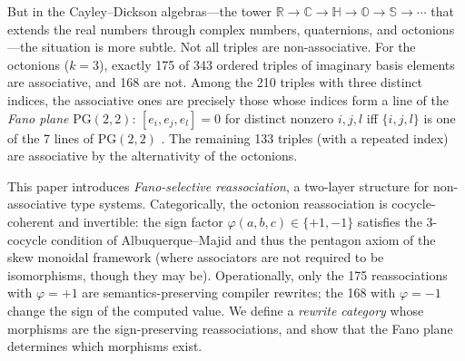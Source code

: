 \documentclass[11pt,a4paper]{article}
\theoremstyle{definition}
\theoremstyle{remark}
\newcommand{\RR}{\mathbb{R}}
\newcommand{\CC}{\mathbb{C}}
\newcommand{\HH}{\mathbb{H}}
\newcommand{\OO}{\mathbb{O}}
\newcommand{\SSS}{\mathbb{S}}
\newcommand{\PG}{\mathrm{PG}}
\begin{document}
But in the Cayley--Dickson algebras---the tower
$\RR \to \CC \to \HH \to \OO \to \SSS \to \cdots$ that extends the
real numbers through complex numbers, quaternions, and
octonions---the situation is more subtle. Not all triples are
non-associative. For the octonions ($k=3$), exactly 175 of 343
ordered triples of imaginary basis elements are associative, and 168
are not. Among the 210 triples with three distinct indices, the
associative ones are precisely those whose indices form a line of the
\emph{Fano plane} $\PG(2,2)$: $[e_i, e_j, e_l] = 0$ for distinct
nonzero $i,j,l$ iff $\{i,j,l\}$ is one of the 7 lines of $\PG(2,2)$
\cite{baez2002octonions}. The remaining 133 triples (with a repeated
index) are associative by the alternativity of the octonions.

This paper introduces \emph{Fano-selective reassociation}, a
two-layer structure for non-associative type systems. Categorically,
the octonion reassociation is cocycle-coherent and invertible: the
sign factor $\varphi(a,b,c) \in \{+1,-1\}$ satisfies the 3-cocycle
condition of Albuquerque--Majid \cite{albuquerque1999} and thus the
pentagon axiom of the skew monoidal framework
\cite{szlachanyi2012,lackstreet2012} (where associators are not
required to be isomorphisms, though they may be). Operationally,
only the 175 reassociations with $\varphi = +1$ are
semantics-preserving compiler rewrites; the 168 with $\varphi = -1$
change the sign of the computed value. We define a \emph{rewrite
category} whose morphisms are the sign-preserving reassociations,
and show that the Fano plane determines which morphisms exist.
\end{document}
